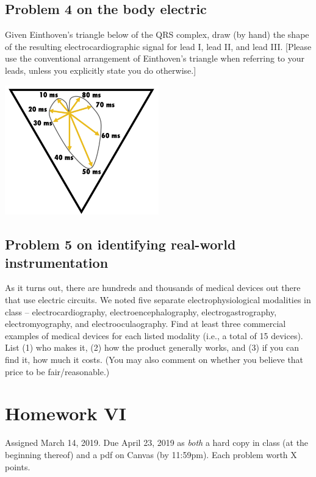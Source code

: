 \documentclass[11pt]{book}
\begin{document}
\section{Problem 4 on the body electric}

Given Einthoven's triangle below of the QRS complex, draw (by hand) the shape of the resulting electrocardiographic signal for lead I, lead II, and lead III. [Please use the conventional arrangement of Einthoven’s triangle when referring to your leads, unless you explicitly state you do otherwise.]

\begin{center}	\includegraphics[width=0.5\textwidth]{figures/hw5.02.png}
\end{center}

\section{Problem 5 on identifying real-world instrumentation}
As it turns out, there are hundreds and thousands of medical devices out there that use electric circuits. We noted five separate electrophysiological modalities in class – electrocardiography, electroencephalography, electrogastrography, electromyography, and electrooculaography. Find at least three commercial examples of medical devices for each listed modality (i.e., a total of 15 devices). List (1) who makes it, (2) how the product generally works, and (3) if you can find it, how much it costs. (You may also comment on whether you believe that price to be fair/reasonable.) 


\chapter*{Homework VI}
Assigned March 14, 2019. Due April 23, 2019 as \textit{both} a hard copy in class (at the beginning thereof) and a pdf on Canvas (by 11:59pm). Each problem worth X points.
\setcounter{chapter}{6}
\setcounter{section}{0}
\end{document}
